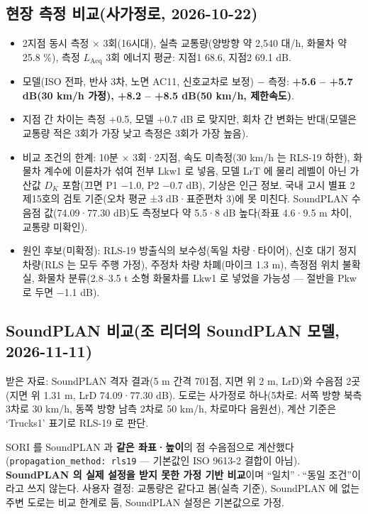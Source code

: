 \documentclass[10pt,a4paper]{article}
\newcommand{\f}[1]{\texttt{#1}}
\begin{document}
\subsection{현장 측정 비교(사가정로, 2026-10-22)}
\begin{itemize}
\item 2지점 동시 측정 × 3회(16시대), 실측 교통량(양방향 약 2,540 대/h, 화물차 약 25.8 \%), 측정 $L_\mathrm{Aeq}$ 3회 에너지 평균: 지점1 68.6, 지점2 69.1 dB.
\item 모델(ISO 전파, 반사 3차, 노면 AC11, 신호교차로 보정) − 측정: \textbf{+5.6 – +5.7 dB(30 km/h 가정), +8.2 – +8.5 dB(50 km/h, 제한속도)}.
\item 지점 간 차이는 측정 +0.5, 모델 +0.7 dB 로 맞지만, 회차 간 변화는 반대(모델은 교통량 적은 3회가 가장 낮고 측정은 3회가 가장 높음).
\item 비교 조건의 한계: 10분 × 3회·2지점, 속도 미측정(30 km/h 는 RLS-19 하한), 화물차 계수에 이륜차가 섞여 전부 Lkw1 로 넣음, 모델 LrT 에 물리 레벨이 아닌 가산값 $D_K$ 포함(끄면 P1 −1.0, P2 −0.7 dB), 기상은 인근 정보. 국내 고시 별표 2 제15호의 검토 기준(오차 평균 ±3 dB·표준편차 3)에 못 미친다. SoundPLAN 수음점 값(74.09·77.30 dB)도 측정보다 약 5.5·8 dB 높다(좌표 4.6·9.5 m 차이, 교통량 미확인).
\item 원인 후보(미확정): RLS-19 방출식의 보수성(독일 차량·타이어), 신호 대기 정지 차량(RLS 는 모두 주행 가정), 주정차 차량 차폐(마이크 1.3 m), 측정점 위치 불확실, 화물차 분류(2.8–3.5 t 소형 화물차를 Lkw1 로 넣었을 가능성 — 절반을 Pkw 로 두면 −1.1 dB).
\end{itemize}

\subsection{SoundPLAN 비교(조 리더의 SoundPLAN 모델, 2026-11-11)}
받은 자료: SoundPLAN 격자 결과(5 m 간격 701점, 지면 위 2 m, LrD)와 수음점 2곳(지면 위 1.31 m, LrD 74.09·77.30 dB). 도로는 사가정로 하나(5차로: 서쪽 방향 북측 3차로 30 km/h, 동쪽 방향 남측 2차로 50 km/h, 차로마다 음원선), 계산 기준은 `Trucks1' 표기로 RLS-19 로 판단.

SORI 를 SoundPLAN 과 \textbf{같은 좌표·높이}의 점 수음점으로 계산했다(\f{propagation\_method: rls19} — 기본값인 ISO 9613-2 결합이 아님). \textbf{SoundPLAN 의 실제 설정을 받지 못한 가정 기반 비교}이며 ``일치''·``동일 조건''이라고 쓰지 않는다. 사용자 결정: 교통량은 같다고 봄(실측 기준), SoundPLAN 에 없는 주변 도로는 비교 한계로 둠, SoundPLAN 설정은 기본값으로 가정.
\end{document}
